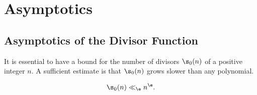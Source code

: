 \documentclass[12pt]{article}
\begin{document}
  \section{Asymptotics}
    \subsection{Asymptotics of the Divisor Function}
      It is essential to have a bound for the number of divisors \(\s_{0}(n)\) of a positive integer \(n\). A sufficient estimate is that \(\s_{0}(n)\) grows slower than any polynomial.

      \begin{proposition}\label{prop:sum_of_divisors_growth_rate}
        \phantom{ }
        \[
          \s_{0}(n) \ll_{\e} n^{\e}.
        \]
      \end{proposition}
\end{document}
